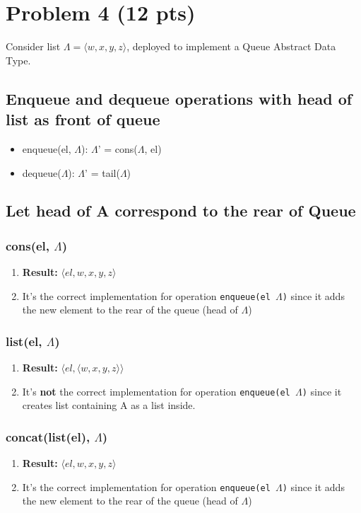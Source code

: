 \newpage

\section{Problem 4 (12 pts)}
Consider list $\Lambda = \langle w, x, y, z \rangle$, deployed to implement a Queue Abstract Data Type.

\subsection{Enqueue and dequeue operations with head of list as front of queue}

\begin{itemize}
    \item[] enqueue(el, $\Lambda$):  $\Lambda$' = cons($\Lambda$, el)
    \item[] dequeue($\Lambda$): $\Lambda$' = tail($\Lambda$)
\end{itemize}

\subsection{Let head of A correspond to the rear of Queue}

\subsubsection{cons(el, $\Lambda$)}
\begin{enumerate}
    \item[] \textbf{Result:} $\langle el, w, x, y, z \rangle$
    \item[] It's the correct implementation for operation \texttt{enqueue(el $\Lambda$)} since it adds the new element to the rear of the queue (head of $\Lambda$)
\end{enumerate}

\subsubsection{list(el, $\Lambda$)}
\begin{enumerate}
    \item[] \textbf{Result:} $\langle el, \langle w, x, y, z \rangle \rangle$
    \item[] It's \textbf{not} the correct implementation for operation \texttt{enqueue(el $\Lambda$)} since it creates list containing A as a list inside.
\end{enumerate}

\subsubsection{concat(list(el), $\Lambda$)}
\begin{enumerate}
    \item[] \textbf{Result:} $\langle el, w, x, y, z \rangle$
    \item[] It's the correct implementation for operation \texttt{enqueue(el $\Lambda$)} since it adds the new element to the rear of the queue (head of $\Lambda$)
\end{enumerate}
